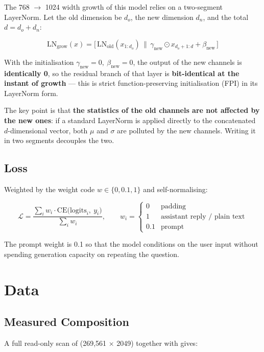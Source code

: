 \documentclass[11pt,openany]{article}
\begin{document}
The 768 $\rightarrow$ 1024 width growth of this model relies on a two-segment LayerNorm.
Let the old dimension be $d_o$, the new dimension $d_n$, and the total
$d = d_o + d_n$:

\[
\text{LN}_{\text{grow}}(x) =
\big[\,\text{LN}_{\text{old}}(x_{1:d_o}) \,\big\|\, \gamma_{\text{new}} \odot x_{d_o+1:d} + \beta_{\text{new}} \,\big]
\]

With the initialisation $\gamma_{\text{new}} = 0,\ \beta_{\text{new}} = 0$, the output of
the new channels is \textbf{identically 0}, so the residual branch of that layer is
\textbf{bit-identical at the instant of growth} --- this is strict function-preserving
initialisation (FPI) in its LayerNorm form.

The key point is that \textbf{the statistics of the old channels are not affected by the
new ones}: if a standard LayerNorm is applied directly to the concatenated
$d$-dimensional vector, both $\mu$ and $\sigma$ are polluted by the new channels. Writing
it in two segments decouples the two.

\subsection{Loss}
\label{sec:en-arch-loss}

Weighted by the weight code $w \in \{0, 0.1, 1\}$ and self-normalising:

\[
\mathcal{L} = \frac{\sum_{i} w_i \cdot \text{CE}\big(\text{logits}_i,\ y_i\big)}{\sum_i w_i},
\qquad
w_i = \begin{cases}
0 & \text{padding} \\
1 & \text{assistant reply / plain text} \\
0.1 & \text{prompt}
\end{cases}
\]

The prompt weight is 0.1 so that the model conditions on the user input without spending
generation capacity on repeating the question.

\section{Data}
\label{sec:en-data}

\subsection{Measured Composition}
\label{sec:en-data-composition}

A full read-only scan of 
(269,561 $\times$ 2049) together with  gives:
\end{document}
